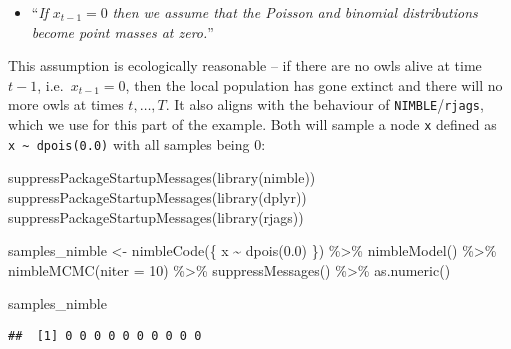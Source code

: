 \documentclass[
  10pt,
  a4paper,
]{article}
\newenvironment{Shaded}{\begin{snugshade}}{\end{snugshade}}
\newcommand{\AttributeTok}[1]{\textcolor[rgb]{0.77,0.63,0.00}{#1}}
\newcommand{\DecValTok}[1]{\textcolor[rgb]{0.00,0.00,0.81}{#1}}
\newcommand{\FloatTok}[1]{\textcolor[rgb]{0.00,0.00,0.81}{#1}}
\newcommand{\FunctionTok}[1]{\textcolor[rgb]{0.00,0.00,0.00}{#1}}
\newcommand{\NormalTok}[1]{#1}
\newcommand{\OtherTok}[1]{\textcolor[rgb]{0.56,0.35,0.01}{#1}}
\newcommand{\SpecialCharTok}[1]{\textcolor[rgb]{0.00,0.00,0.00}{#1}}
\providecommand{\tightlist}{%
  \setlength{\itemsep}{0pt}\setlength{\parskip}{0pt}}
\begin{document}
\begin{itemize}
\tightlist
\item
  ``\emph{If} \(x_{t - 1} = 0\) \emph{then we assume that the Poisson
  and binomial distributions become point masses at zero.}''
\end{itemize}

This assumption is ecologically reasonable -- if there are no owls alive
at time \(t - 1\), i.e.~\(x_{t - 1} = 0\), then the local population has
gone extinct and there will no more owls at times \(t, \ldots, T\). It
also aligns with the behaviour of \texttt{NIMBLE}/\texttt{rjags}, which
we use for this part of the example. Both will sample a node \texttt{x}
defined as \texttt{x\ \textasciitilde{}\ dpois(0.0)} with all samples
being \(0\):

\begin{Shaded}
\begin{Highlighting}[]
\FunctionTok{suppressPackageStartupMessages}\NormalTok{(}\FunctionTok{library}\NormalTok{(nimble))}
\FunctionTok{suppressPackageStartupMessages}\NormalTok{(}\FunctionTok{library}\NormalTok{(dplyr))}
\FunctionTok{suppressPackageStartupMessages}\NormalTok{(}\FunctionTok{library}\NormalTok{(rjags))}

\NormalTok{samples\_nimble }\OtherTok{\textless{}{-}} \FunctionTok{nimbleCode}\NormalTok{(\{}
\NormalTok{  x }\SpecialCharTok{\textasciitilde{}} \FunctionTok{dpois}\NormalTok{(}\FloatTok{0.0}\NormalTok{)}
\NormalTok{\}) }\SpecialCharTok{\%\textgreater{}\%}
  \FunctionTok{nimbleModel}\NormalTok{() }\SpecialCharTok{\%\textgreater{}\%}
  \FunctionTok{nimbleMCMC}\NormalTok{(}\AttributeTok{niter =} \DecValTok{10}\NormalTok{) }\SpecialCharTok{\%\textgreater{}\%}
  \FunctionTok{suppressMessages}\NormalTok{() }\SpecialCharTok{\%\textgreater{}\%}
  \FunctionTok{as.numeric}\NormalTok{()}

\NormalTok{samples\_nimble}
\end{Highlighting}
\end{Shaded}

\begin{verbatim}
##  [1] 0 0 0 0 0 0 0 0 0 0
\end{verbatim}
\end{document}
